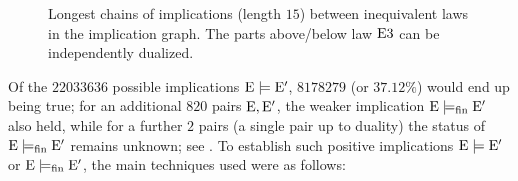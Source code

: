 \begin{figure}
{%
    }
    \caption{Longest chains of implications (length $15$) between inequivalent laws in the implication graph.  The parts above/below law $\mathrm{E}3$ can be independently dualized. }
    \label{fig:longchain}
\end{figure}

Of the $\num{22033636}$ possible implications ${\mathrm{E}} \models {\mathrm{E}'}$, $\num{8178279}$ (or $37.12\%$) would end up being true; for an additional $820$ pairs $\mathrm{E},{\mathrm{E}'}$, the weaker implication ${\mathrm{E}} \models_{\mathrm{fin}} {\mathrm{E}'}$ also held, while for a further $2$ pairs (a single pair up to duality) the status of ${\mathrm{E}} \models_{\mathrm{fin}} {\mathrm{E}'}$ remains unknown; see . To establish such positive implications ${\mathrm{E}} \models {\mathrm{E}'}$ or ${\mathrm{E}} \models_{\mathrm{fin}} {\mathrm{E}'}$, the main techniques used were as follows:

